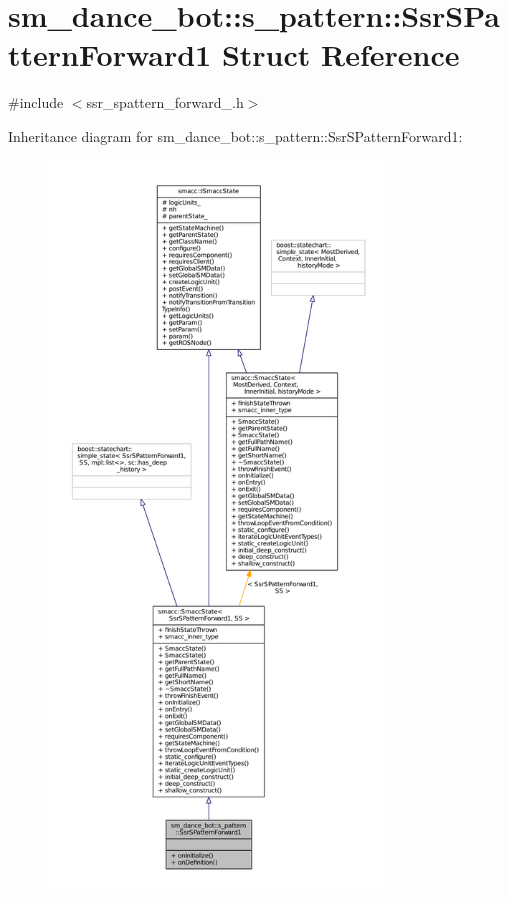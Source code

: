 \hypertarget{structsm__dance__bot_1_1s__pattern_1_1SsrSPatternForward1}{}\section{sm\+\_\+dance\+\_\+bot\+:\+:s\+\_\+pattern\+:\+:Ssr\+S\+Pattern\+Forward1 Struct Reference}
\label{structsm__dance__bot_1_1s__pattern_1_1SsrSPatternForward1}


{\ttfamily \#include $<$ssr\+\_\+spattern\+\_\+forward\+\_.\+h$>$}



Inheritance diagram for sm\+\_\+dance\+\_\+bot\+:\+:s\+\_\+pattern\+:\+:Ssr\+S\+Pattern\+Forward1\+:
\nopagebreak
\begin{figure}[H]
\begin{center}
\leavevmode
\includegraphics[height=550pt]{structsm__dance__bot_1_1s__pattern_1_1SsrSPatternForward1__inherit__graph}
\end{center}
\end{figure}


